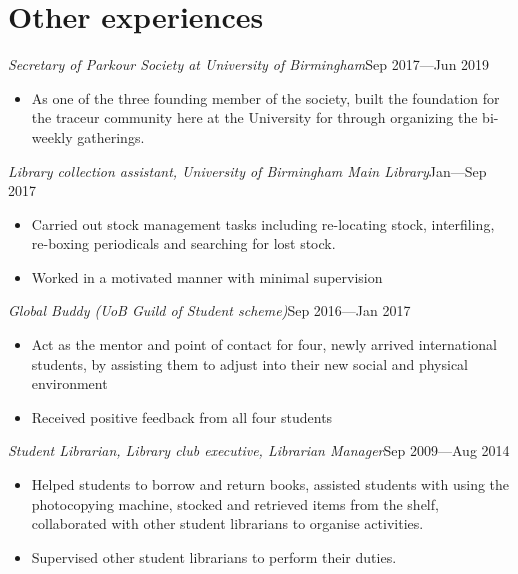 \documentclass[a4paper, 12pt]{article}
\newcommand{\expentry}[3]{\emph{#1}\hfill{#2}---{#3}}
\begin{document}
\section{Other experiences}
\expentry{Secretary of Parkour Society at University of Birmingham}{Sep 2017}{Jun 2019}
    \begin{itemize}
    \setlength\itemsep{0em}
    \item As one of the three founding member of the society, built the foundation for the traceur community here at the University for through organizing the bi-weekly gatherings.
    \end{itemize}
\expentry{Library collection assistant, University of Birmingham Main Library}{Jan}{Sep 2017}
    \begin{itemize}
    \setlength\itemsep{0em}
    \item Carried out stock management tasks including re-locating stock, interfiling, re-boxing periodicals and searching for lost stock.
    \item Worked in a motivated manner with minimal supervision
    \end{itemize}
\expentry{Global Buddy (UoB Guild of Student scheme)}{Sep 2016}{Jan 2017}
    \begin{itemize}
    \setlength\itemsep{0em}
    \item Act as the mentor and point of contact for four, newly arrived international students, by assisting them to adjust into their new social and physical environment
    \item Received positive feedback from all four students
    \end{itemize}
\expentry{Student Librarian, Library club executive, Librarian Manager}{Sep 2009}{Aug 2014}
    \begin{itemize}
    \setlength\itemsep{0em}
    \item Helped students to borrow and return books, assisted students with using the photocopying machine, stocked and retrieved items from the shelf, collaborated with other student librarians to organise activities.
    \item Supervised other student librarians to perform their duties.
    \end{itemize}
\end{document}

